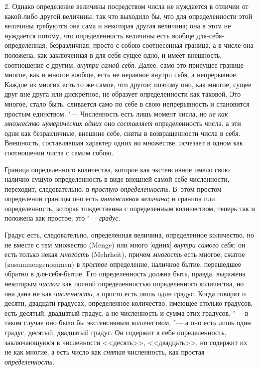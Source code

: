 2. Однако определение величины посредством числа не нуждается в отличии от
какой-либо другой величины, так что выходило бы, что для определенности
этой величины требуются она сама и некоторая другая величина; она в этом не
нуждается потому, что определенность величины есть вообще
для-себя-определенная, безразличная, просто с собою соотнесенная граница, а
в числе она положена, как заключенная в для-себя-сущее одно, и имеет
внешность, соотношение с другим, {\em внутри самой
себя}. Далее, само это присущее границе многое, как и многое вообще, есть
не неравное внутри себя, а непрерывное. Каждое из многих есть то же самое,
что другое; поэтому оно, как многое, сущее друг вне друга или дискретное,
не образует определенности как таковой. Это многое, стало быть, сливается
само по себе в свою непрерывность и становится простым единством. "---
Численность есть лишь момент числа, но {\em не как
множество нумерических одних} оно {\em составляет}
определенность числа, а эти одни как безразличные, внешние себе, сняты в
возвращенности числа в себя. Внешность, составлявшая характер одних во
множестве, исчезает в одном как соотношении числа с самим собою.

Граница определенного количества, которое как экстенсивное имело свою
налично сущую определенность в виде внешней самой себе численности,
переходит, следовательно, в {\em простую
определенность}. В~этом простом определении границы оно есть
{\em интенсивная величина}; и граница или
определенность, которая тождественна с определенным количеством, теперь так
и положена как простое; это "--- {\em градус}.

Градус есть, следовательно, определенная величина, определенное количество,
но не вместе с тем множество (Menge) или много [одних]
{\em внутри самого себя}; он есть только некая
{\em многость} (Mehrheit), причем
{\em многость} есть многое, сжатое (zusammengenommen) в
{\em простое} определение, наличное бытие, перешедшее
обратно в для-себя-бытие. Его определенность должна быть, правда, выражена
некоторым {\em числом} как полной определенностью
определенного количества, но она дана не как
{\em численность}, а просто есть лишь один градус.
Когда говорят о десяти, двадцати градусах, определенное количество, имеющее
столько градусов, есть десятый, двадцатый градус, а не численность и сумма
этих градусов, "--- в таком случае оно было бы экстенсивным количеством, "--- а
оно есть лишь один градус, десятый, двадцатый градус. Он содержит в себе
определенность, заключающуюся в численности <<десять>>, <<двадцать>>, но
содержит их не как многие, а есть число как
{\em снятая} численность, как простая
{\em определенность}.

